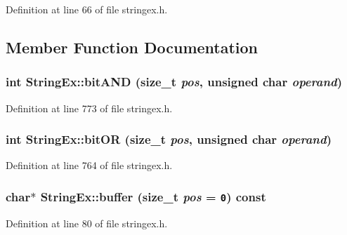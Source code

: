 Definition at line 66 of file stringex.h.

\subsection{Member Function Documentation}
\hypertarget{classStringEx_be938bfb161e2ed249e485f0224d056a}{
\subsubsection[{bitAND}]{\setlength{\rightskip}{0pt plus 5cm}int StringEx::bitAND (size\_\-t {\em pos}, \/  unsigned char {\em operand})}}
\label{classStringEx_be938bfb161e2ed249e485f0224d056a}




Definition at line 773 of file stringex.h.\hypertarget{classStringEx_621b56ed19f2d9de1fe6ecc7e39edc56}{
\subsubsection[{bitOR}]{\setlength{\rightskip}{0pt plus 5cm}int StringEx::bitOR (size\_\-t {\em pos}, \/  unsigned char {\em operand})}}
\label{classStringEx_621b56ed19f2d9de1fe6ecc7e39edc56}




Definition at line 764 of file stringex.h.\hypertarget{classStringEx_2b4c36bb82f085f585dd80f014aed462}{
\subsubsection[{buffer}]{\setlength{\rightskip}{0pt plus 5cm}char$\ast$ StringEx::buffer (size\_\-t {\em pos} = {\tt 0}) const}}
\label{classStringEx_2b4c36bb82f085f585dd80f014aed462}




Definition at line 80 of file stringex.h.

